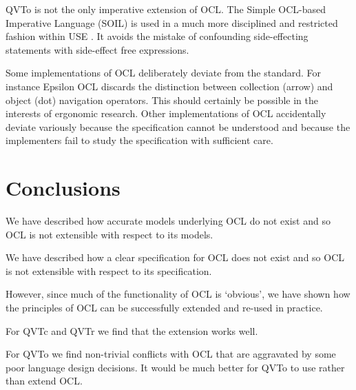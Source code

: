 \documentclass{llncs}
\begin{document}
QVTo is not the only imperative extension of OCL. The  Simple OCL-based Imperative Language (SOIL) \cite{SOIL} is used in a much more disciplined and restricted fashion within USE \cite{USE}. It avoids the mistake of confounding side-effecting statements with side-effect free expressions.

Some implementations of OCL deliberately deviate from the standard. For instance Epsilon OCL \cite{Epsilon} discards the distinction between collection (arrow) and object (dot) navigation operators. This should certainly be possible in the interests of ergonomic research. Other implementations of OCL accidentally deviate variously because the specification cannot be understood and because the implementers fail to study the specification with sufficient care.
%
\section{Conclusions}\label{Conclusions}
%
We have described how accurate models underlying OCL do not exist and so OCL is not extensible with respect to its models.

We have described how a clear specification for OCL does not exist and so OCL is not extensible with respect to its specification.

However, since much of the functionality of OCL is `obvious', we have shown how the principles of OCL can be successfully extended and re-used in practice.

For QVTc and QVTr we find that the extension works well.

For QVTo we find non-trivial conflicts with OCL that are aggravated by some poor language design decisions. It would be much better for QVTo to use rather than extend OCL.


\end{document}
